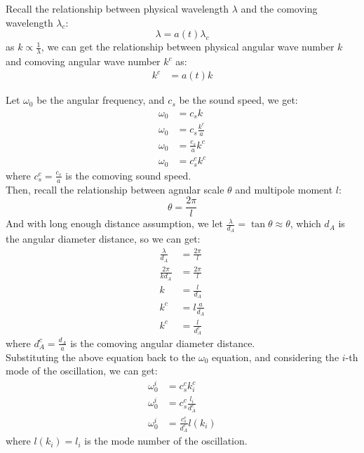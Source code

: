 \clearpage
\begin{foundation}
    Recall the relationship between physical wavelength $\lambda$ and the comoving wavelength $\lambda_c$:
    \[
        \lambda = a(t) \lambda_c
    \]
    as $k \propto \frac{1}{\lambda}$, we can get the relationship between physical angular wave number $k$ and comoving angular wave number $k^c$ as:
    \begin{align*}
        k^c &= a(t) k
    \end{align*}

    Let $\omega_0$ be the angular frequency, and $c_s$ be the sound speed, we get:
    \begin{align*}
        \omega_0 &= c_s k \\
        \omega_0 &= c_s \frac{k^c}{a} \\
        \omega_0 &= \frac{c_s }{a} k^c \\
        \omega_0 &= c_s^c k^c
    \end{align*}
    where $c_s^c = \frac{c_s}{a}$ is the comoving sound speed. \\

    Then, recall the relationship between agnular scale $\theta$ and multipole moment $l$:
    \[
        \theta = \frac{2\pi}{l}
    \]
    And with long enough distance assumption, we let $\frac{\lambda}{d_A} = \tan \theta \approx \theta$, which $d_A$ is the angular diameter distance, so we can get:
    \begin{align*}
        \frac{\lambda}{d_A} &= \frac{2\pi}{l} \\
        \frac{2\pi}{k d_A} &= \frac{2\pi}{l} \\
        k &= \frac{l}{d_A} \\
        k^c &= l \frac{a}{d_A} \\
        k^c &= \frac{l}{d_A^c}
    \end{align*}
    where $d_A^c = \frac{d_A}{a}$ is the comoving angular diameter distance. \\

    Substituting the above equation back to the $\omega_0$ equation, and considering the $i$-th mode of the oscillation, we can get:
    \begin{align*}
        \omega_0^i &= c_s^c k^c_i \\
        \omega_0^i &= c_s^c \frac{l_i}{d_A^c} \\
        \omega_0^i &= \frac{c_s^c}{d_A^c} l(k_i)
    \end{align*}
    where $l(k_i) = l_i$ is the mode number of the oscillation.
\end{foundation}


